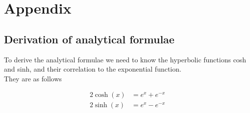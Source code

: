 \documentclass{article}
\begin{document}
\begin{thebibliography}{}

\iffalse
\bibitem{task}
Morten H. Jensen (2019), \href{https://github.com/CompPhysics/ComputationalPhysics/blob/master/doc/Projects/2019/Project4/pdf/Project4.pdf}{Project 4}, Departement of Physics, University of Oslo, Norway

\bibitem{github}
Erik B. Grammeltvedt, Alexandra Jahr Kolstad, Erlend T. North (2019), \href{https://github.com/Erikbgram/Fys3150}{GitHub}, Students of Departement of Physics, University of Oslo, Norway

\bibitem{lecture_slides}
Morten H. Jensen (2015), \href{https://github.com/CompPhysics/ComputationalPhysics/blob/master/doc/Lectures/lectures2015.pdf}{Lecture slides for FYS3150}, Department of Physics, University of Oslo, Norway

\bibitem{onsager}
Onsager (1944), \href{https://journals.aps.org/pr/abstract/10.1103/PhysRev.65.117}{"A Two-Dimensional Model with an Order-Disorder Transition"}, American Physical Society

\bibitem{isingmodel}
Jacob Linder (2018), \href{https://snl.no/Ising-modellen}{Ising-modellen}, Store Norske Leksikon \\
\fi

\end{thebibliography}


\vspace{1cm}


\appendix
\section{Appendix} \label{sec:Appendix}

\iffalse
\subsection{Derivation of analytical formulae}

To derive the analytical formulae we need to know the hyperbolic functions cosh and sinh, and their correlation to the exponential function. \\

They are as follows

\begin{align*}
    2 \cosh (x) &= e^x + e^{-x} \\
    2 \sinh (x) &= e^x - e^{-x}
\end{align*} \\
\end{document}
